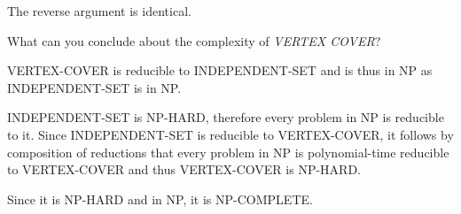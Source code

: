 \documentclass{supervision}
\begin{document}
\begin{questions}
\begin{parts}
\begin{subparts}
\begin{solution}
                The reverse argument is identical.
              \end{solution}

            \subpart[2] What can you conclude about the complexity of
              \emph{VERTEX COVER}?
              \begin{solution}
                VERTEX-COVER is reducible to INDEPENDENT-SET and is thus in NP
                as INDEPENDENT-SET is in NP.

                INDEPENDENT-SET is NP-HARD, therefore every problem in NP is
                reducible to it. Since INDEPENDENT-SET is reducible to
                VERTEX-COVER, it follows by composition of reductions that every
                problem in NP is polynomial-time reducible to VERTEX-COVER and
                thus VERTEX-COVER is NP-HARD.

                Since it is NP-HARD and in NP, it is NP-COMPLETE.
              \end{solution}
          \end{subparts}

      \end{parts}

  \end{questions}
\end{document}

